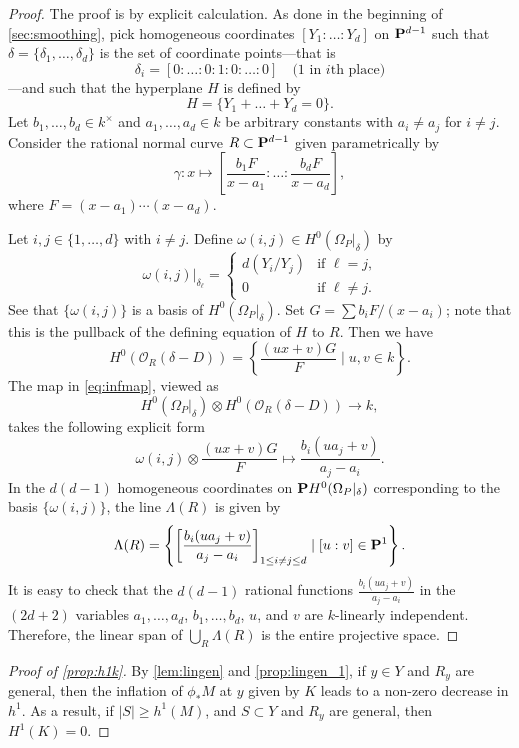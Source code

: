 \documentclass[11 pt]{amsart}
\renewcommand{\k}{k}
\renewcommand{\O}{{\mathcal O}}
\renewcommand {\P}{{\bf P}}
\providecommand {\from}{{\colon}}
\numberwithin{equation}{section}
\begin{document}
\begin{proof}
  The proof is by explicit calculation.
  As done in the beginning of \autoref{sec:smoothing}, pick homogeneous coordinates $[Y_1: \dots: Y_{d}]$ on $\P^{d-1}$ such that $\delta = \{\delta_1, \dots, \delta_d\}$ is the set of coordinate points---that is
  \[ \delta_i = [0:\dots : 0 : 1 : 0 : \dots : 0] \quad \text{(1 in $i$th place)}\]
  ---and such that the hyperplane $H$ is defined by
  \[ H = \{ Y_1 + \dots + Y_{d} = 0 \}.\]
  Let $b_1, \dots, b_d \in \k^\times$ and $a_1, \dots ,a_d \in \k$ be arbitrary constants with $a_i \neq a_j$ for $i \neq j$.
  Consider the rational normal curve $R \subset \P^{d-1}$ given parametrically by
  \[ \gamma \from x \mapsto \left[\frac{b_1 F} {x-a_1}: \dots : \frac{b_d F}{x-a_d}\right],\]
  where $F = (x-a_1) \cdots (x-a_d)$.

  Let $i, j \in \{1, \dots, d \}$ with $i \neq j$.
  Define $\omega(i,j) \in H^0(\Omega_P|_\delta)$ by
  \[ \omega(i,j)\big|_{\delta_\ell} = \begin{cases} d(Y_i / Y_j) & \text{if $\ell = j$,} \\ 0 &\text{if $\ell \neq j$.}
    \end{cases}
  \]
  See that $\{\omega(i,j)\}$ is a basis of $H^0(\Omega_P|_\delta)$.
  Set $G = \sum b_i F/(x-a_i)$; note that this is the pullback of the defining equation of $H$ to $R$.
  Then we have
  \[ H^0(\O_R(\delta-D)) = \left\{ \frac{(ux+v)G}{F} \mid u, v \in k \right \}.\]
  The map in \eqref{eq:infmap}, viewed as 
  \[ H^0\left(\Omega_P|_\delta\right) \otimes H^0(\O_R(\delta-D)) \to \k,\]
  takes the following explicit form
  \[ \omega(i,j) \otimes \frac{(ux+v)G}{F} \mapsto \frac{b_i (ua_j+v)}{a_j-a_i}.\]
  In the $d(d-1)$ homogeneous coordinates on $\P H^0(\Omega_P|_\delta)$ corresponding to the basis $\{\omega(i,j)\}$, the line $\Lambda(R)$ is given by
  \[ \Lambda(R) = \left\{\left[\frac{b_i (ua_j+v)}{a_j-a_i}\right]_{1 \leq i \neq j \leq d} \mid
      [u:v] \in \P^1 \right \}.\]
  It is easy to check that the $d(d-1)$ rational functions $\frac{b_i (ua_j+v)}{a_j-a_i}$ in the $(2d+2)$ variables $a_1, \dots, a_d$, $b_1, \dots, b_d$, $u$, and $v$ are $\k$-linearly independent.
  Therefore, the linear span of $\bigcup_R \Lambda(R)$ is the entire projective space.
\end{proof}

\begin{proof}[Proof of \autoref{prop:h1k}]
  By \autoref{lem:lingen} and \autoref{prop:lingen_1}, if $y \in Y$ and $R_y$ are general, then the inflation of $\phi_*M$ at $y$ given by $K$ leads to a non-zero decrease in $h^1$.
  As a result, if $|S| \geq h^1(M)$, and $S \subset Y$ and $R_y$ are general, then $H^1(K) = 0$.
\end{proof}
\end{document}
